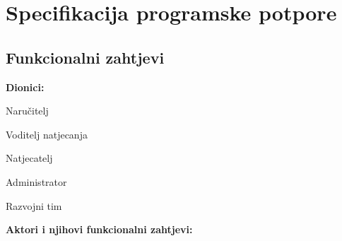 \chapter{Specifikacija programske potpore}
		
		
\section{Funkcionalni zahtjevi}

\noindent \textbf{Dionici:}

\begin{packed_enum}
	\item Naručitelj
	\item Voditelj natjecanja
	\item Natjecatelj				
	\item Administrator
	\item Razvojni tim
	
\end{packed_enum}

\noindent \textbf{Aktori i njihovi funkcionalni zahtjevi:}


